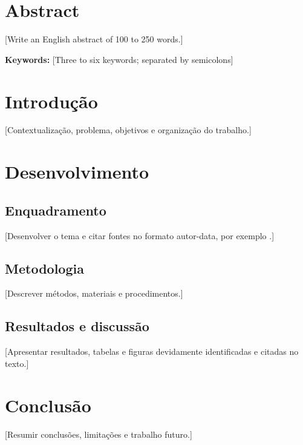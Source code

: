 \documentclass[12pt,a4paper,oneside,openright]{book}
\begin{document}
\chapter*{Abstract}
[Write an English abstract of 100 to 250 words.]
\par\medskip\noindent\textbf{Keywords:} [Three to six keywords; separated by semicolons]
\cleardoublepage

\tableofcontents
\listoffigures
\listoftables
\cleardoublepage

\mainmatter
\chapter{Introdução}
[Contextualização, problema, objetivos e organização do trabalho.]

\chapter{Desenvolvimento}
\section{Enquadramento}
[Desenvolver o tema e citar fontes no formato autor-data, por exemplo \parencite{ipbeja_normas_trabalhos_2024}.]
\section{Metodologia}
[Descrever métodos, materiais e procedimentos.]
\section{Resultados e discussão}
[Apresentar resultados, tabelas e figuras devidamente identificadas e citadas no texto.]

\chapter{Conclusão}
[Resumir conclusões, limitações e trabalho futuro.]

\backmatter
\printbibliography[heading=bibintoc,title={Referências Bibliográficas}]
\end{document}
